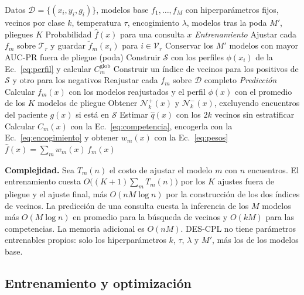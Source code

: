 \documentclass[pdflatex,sn-mathphys-num]{sn-jnl}
\theoremstyle{plain}
\begin{document}
\begin{algorithm}
\caption{DES-CPL: entrenamiento y predicción}\label{alg:descpl}
\begin{algorithmic}[1]
\Require Datos $\mathcal{D}=\{(x_i,y_i,g_i)\}$, modelos base $f_1,\dots,f_M$ con hiperparámetros fijos, vecinos por clase $k$, temperatura $\tau$, encogimiento $\lambda$, modelos tras la poda $M'$, pliegues $K$
\Ensure Probabilidad $\hat{f}(x)$ para una consulta $x$
\Statex \textit{Entrenamiento}
    \State Ajustar cada $f_m$ sobre $\mathcal{T}_r$ y guardar $\tilde{f}_m(x_i)$ para $i\in\mathcal{V}_r$
\EndFor
\State Conservar los $M'$ modelos con mayor AUC-PR fuera de pliegue (poda)
\State Construir $\mathcal{S}$ con los perfiles $\phi(x_i)$ de la Ec.~\eqref{eq:perfil} y calcular $C^{\text{glob}}_m$
\State Construir un índice de vecinos para los positivos de $\mathcal{S}$ y otro para los negativos
\State Reajustar cada $f_m$ sobre $\mathcal{D}$ completo
\Statex \textit{Predicción}
\State Calcular $f_m(x)$ con los modelos reajustados y el perfil $\phi(x)$ con el promedio de los $K$ modelos de pliegue
\State Obtener $\mathcal{N}^{+}_{k}(x)$ y $\mathcal{N}^{-}_{k}(x)$, excluyendo encuentros del paciente $g(x)$ si está en $\mathcal{S}$
\State Estimar $\hat{q}(x)$ con los $2k$ vecinos sin estratificar
\State Calcular $C_m(x)$ con la Ec.~\eqref{eq:competencia}, encogerla con la Ec.~\eqref{eq:encogimiento} y obtener $w_m(x)$ con la Ec.~\eqref{eq:pesos}
\State \Return $\hat{f}(x)=\sum_m w_m(x)\,f_m(x)$
\end{algorithmic}
\end{algorithm}

\textbf{Complejidad.} Sea $T_m(n)$ el costo de ajustar el modelo $m$ con $n$ encuentros. El entrenamiento cuesta $O\big((K+1)\sum_m T_m(n)\big)$ por los $K$ ajustes fuera de pliegue y el ajuste final, más $O(nM\log n)$ por la construcción de los dos índices de vecinos. La predicción de una consulta cuesta la inferencia de los $M$ modelos más $O(M\log n)$ en promedio para la búsqueda de vecinos y $O(kM)$ para las competencias. La memoria adicional es $O(nM)$. DES-CPL no tiene parámetros entrenables propios: solo los hiperparámetros $k$, $\tau$, $\lambda$ y $M'$, más los de los modelos base.

\subsection{Entrenamiento y optimización}\label{subsec:entrenamiento}
\end{document}
